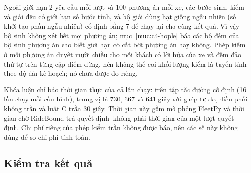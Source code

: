 Ngoài giới hạn 2 yêu cầu mỗi lượt và 100 phương án mỗi xe, các bước sinh, kiểm và giải đều có giới hạn số bước
tính, và bộ giải dùng hạt giống ngẫu nhiên (số khởi tạo phần ngẫu nhiên) cố định bằng 7 để chạy lại cho cùng kết
quả. Vì vậy bộ sinh không xét hết mọi phương án; mục~\ref{muc:c4-hople} báo các bộ đếm của bộ sinh phương án cho biết
giới hạn có cắt bớt phương án hay không. Phép kiểm ở mỗi phương án duyệt mười chiều cho mỗi khách có lời hứa của xe và đếm đảo thứ tự
trên từng cặp điểm dừng, nên không thể coi khối lượng kiểm là tuyến tính theo độ dài kế hoạch; nó chưa được đo
riêng.

Khóa luận chỉ báo thời gian thực của cả lần chạy: trên tập tắc đường cố định (16 lần chạy mỗi cấu hình), trung vị là
730, 667 và 641 giây với ghép tự do, điều phối không trần và luật C trần 30 giây. Thời gian này gồm mô phỏng FleetPy
và thời gian chờ RideBound trả quyết định, không phải thời gian của một lượt quyết định. Chi phí riêng của phép kiểm trần
không được báo, nên các số này không dùng để so chi phí tính toán.

\subsection{Kiểm tra kết quả}
\label{muc:kiemtra}

